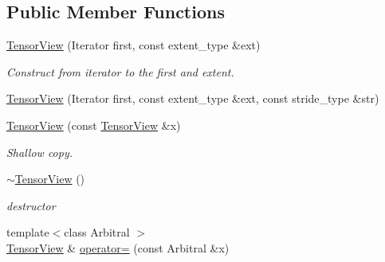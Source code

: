 \subsection*{Public Member Functions}
\begin{DoxyCompactItemize}
\item 
\hypertarget{classbtas_1_1_tensor_view_a08f472433b7876200fd0e30d839b367e}{
\hyperlink{classbtas_1_1_tensor_view_a08f472433b7876200fd0e30d839b367e}{TensorView} (Iterator first, const extent\_\-type \&ext)}
\label{classbtas_1_1_tensor_view_a08f472433b7876200fd0e30d839b367e}

\begin{DoxyCompactList}\small\item\em Construct from iterator to the first and extent. \item\end{DoxyCompactList}\item 
\hyperlink{classbtas_1_1_tensor_view_a028fd76cdf15bf5d7cfe8fd4b89ff907}{TensorView} (Iterator first, const extent\_\-type \&ext, const stride\_\-type \&str)
\item 
\hypertarget{classbtas_1_1_tensor_view_a1f3dc267b6e5627b75dfdcde35ae1a89}{
\hyperlink{classbtas_1_1_tensor_view_a1f3dc267b6e5627b75dfdcde35ae1a89}{TensorView} (const \hyperlink{classbtas_1_1_tensor_view}{TensorView} \&x)}
\label{classbtas_1_1_tensor_view_a1f3dc267b6e5627b75dfdcde35ae1a89}

\begin{DoxyCompactList}\small\item\em Shallow copy. \item\end{DoxyCompactList}\item 
\hypertarget{classbtas_1_1_tensor_view_a3866ea310097cc13b71c38265eefaf25}{
\hyperlink{classbtas_1_1_tensor_view_a3866ea310097cc13b71c38265eefaf25}{$\sim$TensorView} ()}
\label{classbtas_1_1_tensor_view_a3866ea310097cc13b71c38265eefaf25}

\begin{DoxyCompactList}\small\item\em destructor \item\end{DoxyCompactList}\item 
\hypertarget{classbtas_1_1_tensor_view_ad98f3d45b49555704551027d1a4c3964}{
{\footnotesize template$<$class Arbitral $>$ }\\\hyperlink{classbtas_1_1_tensor_view}{TensorView} \& \hyperlink{classbtas_1_1_tensor_view_ad98f3d45b49555704551027d1a4c3964}{operator=} (const Arbitral \&x)}
\label{classbtas_1_1_tensor_view_ad98f3d45b49555704551027d1a4c3964}


\end{DoxyCompactItemize}
